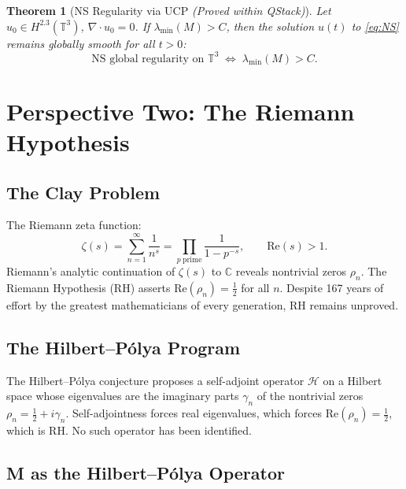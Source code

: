 \documentclass[12pt]{article}
\newtheorem{theorem}{Theorem}[section]
\begin{document}
\begin{theorem}[NS Regularity via UCP \emph{(Proved within QStack)}]
\label{thm:NS}
Let $u_0 \in H^{2.3}(\mathbb{T}^3)$, $\nabla \cdot u_0 = 0$.
If $\lambda_{\min}(M) > C$, then the solution $u(t)$
to \eqref{eq:NS} remains globally smooth for all $t > 0$:
\begin{equation}
\boxed{
\text{NS global regularity on } \mathbb{T}^3
\;\Longleftrightarrow\;
\lambda_{\min}(M) > C.
}
\label{eq:NSreduction}
\end{equation}
\end{theorem}

\section{Perspective Two: The Riemann Hypothesis}

\subsection{The Clay Problem}

The Riemann zeta function:
\begin{equation}
\zeta(s) = \sum_{n=1}^{\infty} \frac{1}{n^s}
= \prod_{p\ \mathrm{prime}} \frac{1}{1 - p^{-s}},
\qquad \mathrm{Re}(s) > 1.
\label{eq:zeta}
\end{equation}
Riemann's analytic continuation of $\zeta(s)$ to $\mathbb{C}$
reveals nontrivial zeros $\rho_n$. The Riemann Hypothesis (RH)
asserts $\mathrm{Re}(\rho_n) = \tfrac{1}{2}$ for all $n$.
Despite 167 years of effort by the greatest mathematicians of
every generation, RH remains unproved.

\subsection{The Hilbert--P\'olya Program}

The Hilbert--P\'{o}lya conjecture proposes a self-adjoint
operator $\mathcal{H}$ on a Hilbert space whose eigenvalues
are the imaginary parts $\gamma_n$ of the nontrivial zeros
$\rho_n = \tfrac{1}{2} + i\gamma_n$.
Self-adjointness forces real eigenvalues, which forces
$\mathrm{Re}(\rho_n) = \tfrac{1}{2}$, which is RH.
No such operator has been identified.

\subsection{M as the Hilbert--P\'olya Operator}
\end{document}
